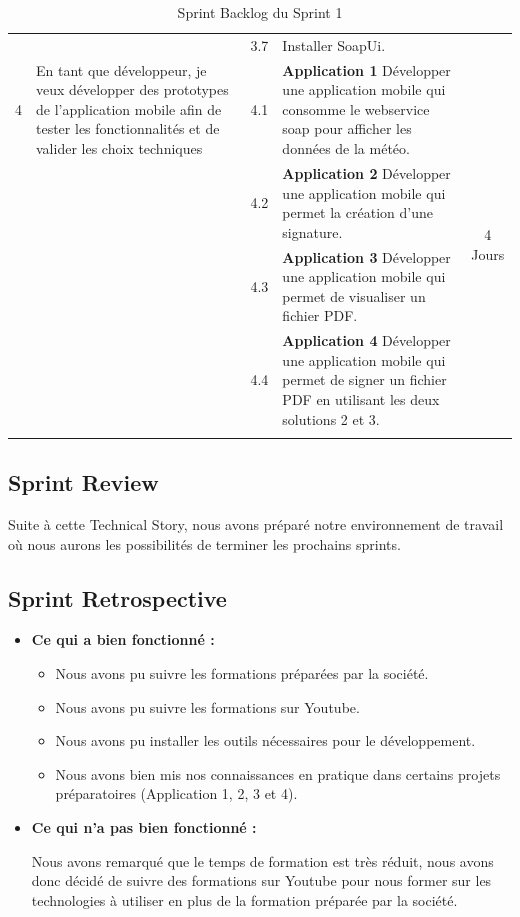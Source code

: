 \begin{adjustwidth}{-1cm}{}
\begin{longtable}{|c|p{6cm}|c|p{6cm}|c|}
    \cline{3-4}
    &  &  3.7 &Installer SoapUi.&\\
    \cline{1-5}
    4 & En tant que développeur, je veux développer des prototypes de l'application mobile afin de tester les fonctionnalités et de valider les choix techniques &  4.1 &\textbf{Application 1} Développer une application mobile qui consomme le webservice soap pour afficher les données de la météo.&\multirow{4}{2cm}{4 Jours}\\
    \cline{3-4}
    &  &  4.2 &\textbf{Application 2} Développer une application mobile qui permet la création d'une signature.&\\
    \cline{3-4}
    &  &  4.3 &\textbf{Application 3} Développer une application mobile qui permet de visualiser un fichier PDF.&\\
    \cline{3-4}
    &  &  4.4 &\textbf{Application 4} Développer une application mobile qui permet de signer un fichier PDF en utilisant les deux solutions 2 et 3.&\\
    \cline{1-5}

  \hline

  \caption{Sprint Backlog du Sprint 1}
  \label{tab:sprint-backlog-1}
\end{longtable}
\end{adjustwidth}
\subsection{Sprint Review}
Suite à cette Technical Story, nous avons préparé notre environnement de travail où nous aurons les possibilités de terminer les prochains sprints.

\subsection{Sprint Retrospective}

\begin{itemize}
  \item \textbf{Ce qui a bien fonctionné :}
  \begin{itemize}
    \item Nous avons pu suivre les formations préparées par la société.
    \item Nous avons pu suivre les formations sur Youtube.
    \item Nous avons pu installer les outils nécessaires pour le développement.
    \item Nous avons bien mis nos connaissances en pratique dans certains projets préparatoires (Application 1, 2, 3 et 4).
  \end{itemize}
  \item \textbf{Ce qui n'a pas bien fonctionné :}
  
  Nous avons remarqué que le temps de formation est très réduit, nous avons donc décidé de suivre des formations sur Youtube pour nous former sur les technologies à utiliser en plus de la formation préparée par la société.
\end{itemize}

